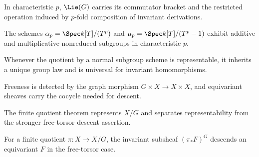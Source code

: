 \begin{remark}
\label{mumford3-lie-algebra}
In characteristic $p$, $\Lie(G)$ carries its commutator bracket and the
restricted operation induced by $p$-fold composition of invariant derivations.
\notready
\end{remark}

\begin{example}
\label{mumford3-alpha-mu-examples}
The schemes $\alpha_p=\Spec k[T]/(T^p)$ and
$\mu_p=\Spec k[T]/(T^p-1)$ exhibit additive and multiplicative nonreduced
subgroups in characteristic $p$.
\notready
\end{example}

\begin{remark}
\label{mumford3-general-quotient-group-scheme}
Whenever the quotient by a normal subgroup scheme is representable, it inherits
a unique group law and is universal for invariant homomorphisms.
\notready
\end{remark}

\begin{remark}
\label{mumford3-action}
Freeness is detected by the graph morphism $G\times X\to X\times X$, and
equivariant sheaves carry the cocycle needed for descent.
\notready
\end{remark}

\begin{remark}
\label{mumford3-finite-quotient-theorem}
The finite quotient theorem represents $X/G$ and separates representability
from the stronger free-torsor descent assertion.
\notready
\end{remark}

\begin{corollary}
\label{mumford3-invariant-pushforward}
For a finite quotient $\pi:X\to X/G$, the invariant subsheaf
$(\pi_*F)^G$ descends an equivariant $F$ in the free-torsor case.
\notready
\end{corollary}

